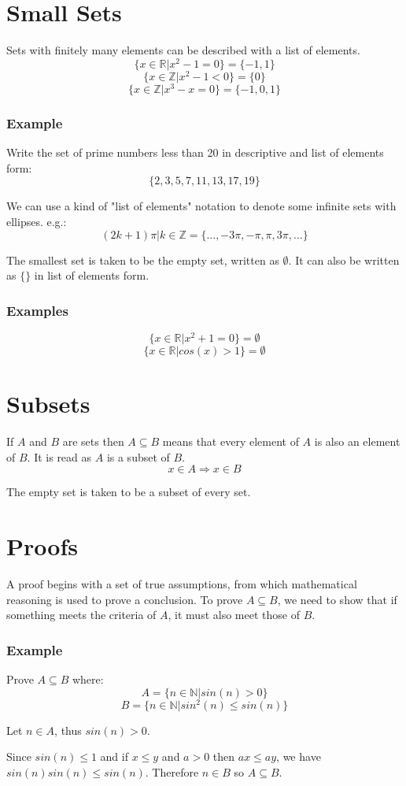 \documentclass[12pt]{report}
\begin{document}
\begin{flushleft}
\section*{Small Sets}
Sets with finitely many elements can be described with a list of elements.
\[\{x \in \mathbb{R} | x^2 - 1 = 0\} = \{-1, 1\}\]
\[\{x \in \mathbb{Z} | x^2 - 1 < 0\} = \{0\}\]
\[\{x \in \mathbb{Z} | x^3 - x = 0\} = \{-1, 0, 1\}\]

\subsubsection*{Example}
Write the set of prime numbers less than 20 in descriptive and list of elements form:
\[\{2, 3, 5, 7, 11, 13, 17, 19\}\]

We can use a kind of "list of elements" notation to denote some infinite sets with ellipses.
e.g.: \[(2k + 1)\pi | k \in \mathbb{Z} = \{..., -3\pi, -\pi, \pi, 3\pi, ...\}\]

The smallest set is taken to be the empty set, written as \(\emptyset\). It can also be written as 
\(\{\}\) in list of elements form.

\subsubsection*{Examples}
\[\{x \in \mathbb{R} | x^2 + 1 = 0\} = \emptyset\]
\[\{x \in \mathbb{R} | cos(x) > 1\} = \emptyset\]

\section*{Subsets}
If \(A\) and \(B\) are sets then \(A \subseteq B\) means that every element of \(A\) is also an element
of \(B\). It is read as \(A\) is a subset of \(B\).
\[x \in A \Rightarrow x \in B\]

The empty set is taken to be a subset of every set.

\section*{Proofs}
A proof begins with a set of true assumptions, from which mathematical reasoning is used
to prove a conclusion.
To prove \(A \subseteq B\), we need to show that if something meets the criteria of \(A\),
it must also meet those of \(B\).

\subsubsection*{Example}
Prove \(A \subseteq B\) where:
\[A = \{n \in \mathbb{N} | sin(n) > 0\}\]
\[B = \{n \in \mathbb{N} | sin^2(n) \leq sin(n)\}\]
\par
Let \(n \in A\), thus \(sin(n) > 0\).
\par
Since \(sin(n) \leq 1\) and if \(x \leq y\) and \(a > 0\) then \(ax \leq ay\), we have \(sin(n)sin(n) \leq sin(n)\).
Therefore \(n \in B\) so \(A \subseteq B\).


\end{flushleft}
\end{document}
